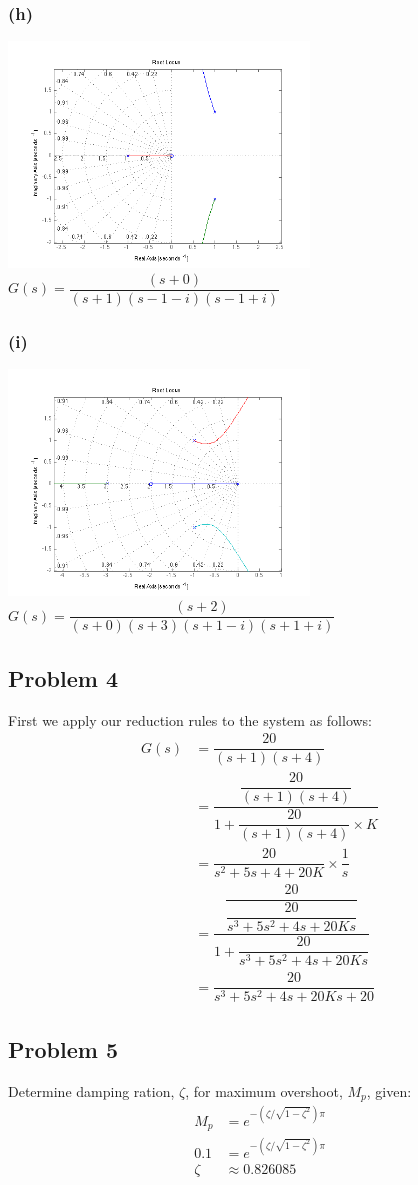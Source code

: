\documentclass[letterpaper,10pt]{article}
\begin{document}
\subsubsection*{(h)}
\begin{center}
    \includegraphics[width=0.6\textwidth]{homework04-7-1-h.png} \\
   $G(s) = \dfrac{(s+0)}{(s+1)(s-1-i)(s-1+i)}$
\end{center}
\subsubsection*{(i)}
\begin{center}
    \includegraphics[width=0.6\textwidth]{homework04-7-1-i.png} \\
   $G(s) = \dfrac{(s+2)}{(s+0)(s+3)(s+1-i)(s+1+i)}$
\end{center}

\subsection*{Problem 4}
First we apply our reduction rules to the system as follows:
\begin{align*}
	G(s) &= \dfrac{20}{(s+1)(s+4)} \\
	&= \dfrac{\dfrac{20}{(s+1)(s+4)}}{1+\dfrac{20}{(s+1)(s+4)}\times K} \\
	&= \dfrac{20}{s^{2}+5s+4+20K} \times \dfrac{1}{s} \\
	&= \dfrac{\dfrac{20}{\dfrac{20}{s^{3}+5s^{2}+4s+20Ks}}}{1+\dfrac{20}{s^{3}+5s^{2}+4s+20Ks}} \\
	&= \dfrac{20}{s^{3}+5s^{2}+4s+20Ks+20}
\end{align*}

\subsection*{Problem 5}
Determine damping ration, $\zeta$, for maximum overshoot, $M_{p}$, given:
\begin{align*}
	M_{p} &= e^{-\left(\zeta/\sqrt{1-\zeta^{2}}\right)\pi} \\
	0.1 &= e^{-\left(\zeta/\sqrt{1-\zeta^{2}}\right)\pi} \\
	\zeta &\approx 0.826085
\end{align*}
\end{document}
